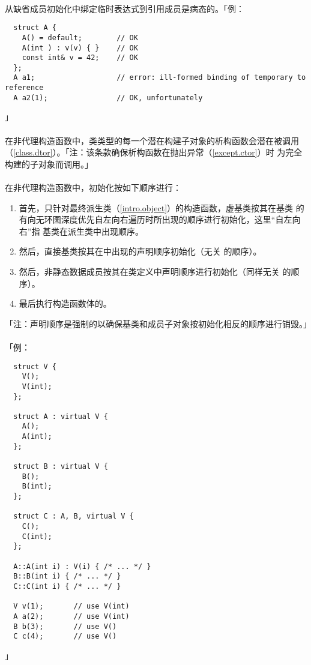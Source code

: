 \paragraph{}
从缺省成员初始化中绑定临时表达式到引用成员是病态的。「例：
\begin{lstlisting}
  struct A {
    A() = default;        // OK
    A(int ) : v(v) { }    // OK
    const int& v = 42;    // OK
  };
  A a1;                   // error: ill-formed binding of temporary to reference
  A a2(1);                // OK, unfortunately
\end{lstlisting}」

\paragraph{}
在非代理构造函数中，类类型的每一个潜在构建子对象的析构函数会潜在被调用
（\ref{class.dtor}）。「注：该条款确保析构函数在抛出异常（\ref{except.ctor}）时
为完全构建的子对象而调用。」

\paragraph{}
在非代理构造函数中，初始化按如下顺序进行：
\begin{enumerate}
  \item{首先，只针对最终派生类（\ref{intro.object}）的构造函数，虚基类按其在基类
    的有向无环图深度优先自左向右遍历时所出现的顺序进行初始化，这里``自左向右''指
    基类在派生类中出现顺序。}
  \item{然后，直接基类按其在中出现的声明顺序初始化（无关
    的顺序）。}
  \item{然后，非静态数据成员按其在类定义中声明顺序进行初始化（同样无关
    的顺序）。}
  \item{最后执行构造函数体的。}
\end{enumerate}
「注：声明顺序是强制的以确保基类和成员子对象按初始化相反的顺序进行销毁。」

\paragraph{}
「例：
\begin{lstlisting}
  struct V {
    V();
    V(int);
  };

  struct A : virtual V {
    A();
    A(int);
  };

  struct B : virtual V {
    B();
    B(int);
  };

  struct C : A, B, virtual V {
    C();
    C(int);
  };

  A::A(int i) : V(i) { /* ... */ }
  B::B(int i) { /* ... */ }
  C::C(int i) { /* ... */ }

  V v(1);       // use V(int)
  A a(2);       // use V(int)
  B b(3);       // use V()
  C c(4);       // use V()
\end{lstlisting}」

